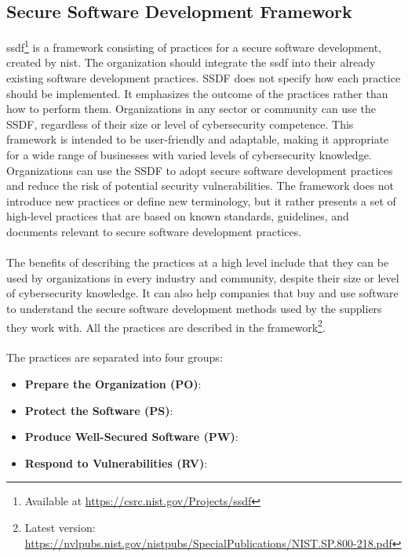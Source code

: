 \subsection{Secure Software Development Framework}
\label{ssdf}
\acrlong{ssdf}\footnote{Available at \url{https://csrc.nist.gov/Projects/ssdf}} is a framework consisting of practices for a secure software development, created by \acrlong{nist}. The organization should integrate the \acrshort{ssdf} into their already existing software development practices. SSDF does not specify how each practice should be implemented. It emphasizes the outcome of the practices rather than how to perform them. Organizations in any sector or community can use the SSDF, regardless of their size or level of cybersecurity competence. This framework is intended to be user-friendly and adaptable, making it appropriate for a wide range of businesses with varied levels of cybersecurity knowledge. Organizations can use the SSDF to adopt secure software development practices and reduce the risk of potential security vulnerabilities. The framework does not introduce new practices or define new terminology, but it rather presents a set of high-level practices that are based on known standards, guidelines, and documents relevant to secure software development practices. 
\\~\\
The benefits of describing the practices at a high level include that they can be used by organizations in every industry and community, despite their size or level of cybersecurity knowledge. It can also help companies that buy and use software to understand the secure software development methods used by the suppliers they work with. All the practices are described in the framework\footnote{Latest version: \url{https://nvlpubs.nist.gov/nistpubs/SpecialPublications/NIST.SP.800-218.pdf}}.
\\~\\
The practices are separated into four groups\cite{ssdf}:
\begin{itemize}
  \item \textbf{Prepare the Organization (PO)}: 
  \item \textbf{Protect the Software (PS)}: 
  \item \textbf{Produce Well-Secured Software (PW)}: 
  \item \textbf{Respond to Vulnerabilities (RV)}: 
\end{itemize}

